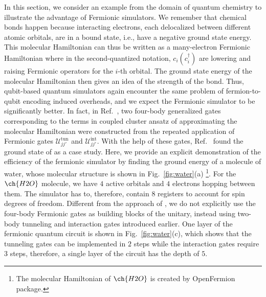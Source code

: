 \documentclass[aps, pra, reprint, superscriptaddress]{revtex4-1}
\begin{document}
In this section, we consider an example from the domain of quantum chemistry to illustrate the advantage of Fermionic simulators. We remember that chemical bonds happen because interacting electrons, each delocalized between different atomic orbitals, are in a bound state, i.e., have a negative ground state energy. This molecular Hamiltonian can thus be written as a many-electron Fermionic Hamiltonian where in the second-quantized notation, $c_i (c_i^{\dagger})$ are lowering and raising Fermionic operators for the $i$-th orbital. The ground state energy of the molecular Hamiltonian then gives an idea of the strength of the bond. Thus, qubit-based quantum simulators again encounter the same problem of fermion-to-qubit encoding induced overheads, and we expect the Fermionic simulator to be significantly better. In fact, in Ref.~\cite{gonzalez2023fermionic}, two four-body generalized gates corresponding to the terms in coupled cluster ansatz of approximating the molecular Hamiltonian \cite{anand2022a} were constructed from the repeated application of Fermionic gates  $\mathcal{U}^{\text{tun}}_{jj'}$ and  $\mathcal{U}^{\text{int}}_{jj'}$. With the help of these gates, Ref.~\cite{gonzalez2023fermionic} found the ground state of  as a case study. 
Here, we provide an explicit demonstration  of the efficiency of the fermionic simulator by finding the ground energy of a molecule of water, whose molecular structure is shown in Fig.~\ref{fig:water}(a) \footnote{The molecular Hamiltonian of $\ch{H2O}$ is created by OpenFermion package.}. For the $\ch{H2O}$ molecule, we have $4$ active orbitals and $4$ electrons hopping between them. The simulator has to, therefore, contain $8$ registers to account for spin degrees of freedom. Different from the approach of \cite{gonzalez2023fermionic}, we do not explicitly use the four-body Fermionic gates as building blocks of the unitary, instead using two-body tunneling and interaction gates introduced earlier. One layer of the fermionic quantum circuit is shown in Fig.~\ref{fig:water}(c), which shows that the tunneling gates can be implemented in $2$ steps while the interaction gates require $3$ steps, therefore, a single layer of the circuit has the depth of $5$. 
\end{document}
